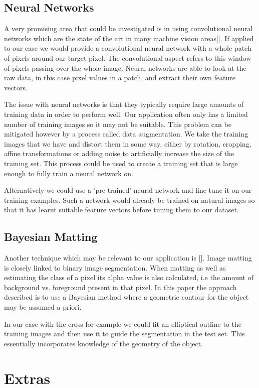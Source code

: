 \documentclass[12pt]{IIBproject}
\begin{document}
\subsection{Neural Networks}
A very promising area that could be investigated is in using convolutional neural networks which are the state of the art in many machine vision areas[]. If applied to our case we would provide a convolutional neural network with a whole patch of pixels around our target pixel. The convolutional aspect refers to this window of pixels passing over the whole image. Neural networks are able to look at the raw data, in this case pixel values in a patch, and extract their own feature vectors. 

The issue with neural networks is that they typically require large amounts of training data in order to perform well. Our application often only has a limited number of training images so it may not be suitable. This problem can be mitigated however by a process called data augmentation. We take the training images that we have and distort them in some way, either by rotation, cropping, affine transformations or adding noise to artificially increase the size of the training set. This process could be used to create a training set that is large enough to fully train a neural network on.

 Alternatively we could use a 'pre-trained' neural network and fine tune it on our training examples. Such a network would already be trained on natural images so that it has learnt suitable feature vectors before tuning them to our dataset.
\subsection{Bayesian Matting}
Another technique which may be relevant to our application is []. Image matting is closely linked to binary image segmentation. When matting as well as estimating the class of a pixel its alpha value is also calculated, i.e the amount of background vs. foreground present in that pixel.  In this paper the approach described is to use a Bayesian method where a geometric contour for the object may be assumed a priori. 

In our case with the cross for example we could fit an elliptical outline to the training images and then use it to guide the segmentation in the test set. This essentially incorporates knowledge of the geometry of the object. 

\section{Extras}
\end{document}
